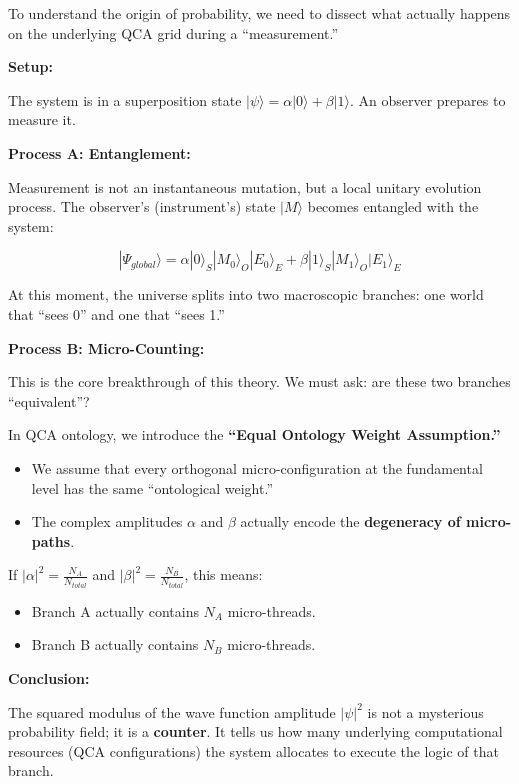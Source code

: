 \documentclass[11pt,a4paper,twoside]{book}
\begin{document}
To understand the origin of probability, we need to dissect what actually happens on the underlying QCA grid during a ``measurement.''

\textbf{Setup:}

The system is in a superposition state \textbf{$|\psi\rangle = \alpha |0\rangle + \beta |1\rangle$}. An observer prepares to measure it.

\textbf{Process A: Entanglement:}

Measurement is not an instantaneous mutation, but a local unitary evolution process. The observer's (instrument's) state \textbf{$|M\rangle$} becomes entangled with the system:

$$|\Psi_{global}\rangle = \alpha |0\rangle_S |M_0\rangle_O |E_0\rangle_E + \beta |1\rangle_S |M_1\rangle_O |E_1\rangle_E$$

At this moment, the universe splits into two macroscopic branches: one world that ``sees 0'' and one that ``sees 1.''

\textbf{Process B: Micro-Counting:}

This is the core breakthrough of this theory. We must ask: are these two branches ``equivalent''?

In QCA ontology, we introduce the \textbf{``Equal Ontology Weight Assumption.''}

\begin{itemize}
\item We assume that every orthogonal micro-configuration at the fundamental level has the same ``ontological weight.''

\item The complex amplitudes \textbf{$\alpha$} and \textbf{$\beta$} actually encode the \textbf{degeneracy of micro-paths}.
\end{itemize}

If \textbf{$|\alpha|^2 = \frac{N_A}{N_{total}}$} and \textbf{$|\beta|^2 = \frac{N_B}{N_{total}}$}, this means:

\begin{itemize}
\item Branch A actually contains \textbf{$N_A$} micro-threads.

\item Branch B actually contains \textbf{$N_B$} micro-threads.
\end{itemize}

\textbf{Conclusion:}

The squared modulus of the wave function amplitude \textbf{$|\psi|^2$} is not a mysterious probability field; it is a \textbf{counter}. It tells us how many underlying computational resources (QCA configurations) the system allocates to execute the logic of that branch.
\end{document}
